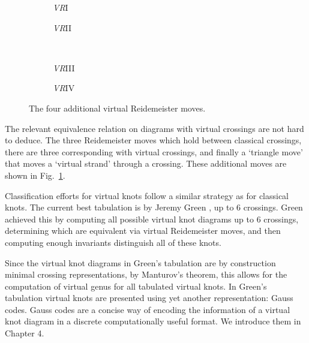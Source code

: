 \documentclass[12pt]{report}
\theoremstyle{upright}
\begin{document}
\begin{figure}[h!]
	\centering
	\hspace*{\fill}
	\begin{subfigure}[b]{0.35 \textwidth}
		\centering
		\def\svgscale{0.22}
		
		\caption{\textit{VR}I}
	\end{subfigure}
	\hspace*{\fill}
	\begin{subfigure}[b]{0.35 \textwidth}
		\centering
		\def\svgscale{0.22}
		
		\caption{\textit{VR}II}
	\end{subfigure}
	\hspace*{\fill}
	\\
	\hspace*{\fill}
	\begin{subfigure}[b]{0.35 \textwidth}
		\centering
		\def\svgscale{0.22}
		
		\caption{\textit{VR}III}
	\end{subfigure}
	\hspace*{\fill}
	\begin{subfigure}[b]{0.35 \textwidth}
		\centering
		\def\svgscale{0.22}
		
		\caption{\textit{VR}IV}
	\end{subfigure}
	\hspace*{\fill}
	\caption{The four additional virtual Reidemeister moves.}
	\label{fig:virtual-reidemeister-moves}
\end{figure}

The relevant equivalence relation on diagrams with virtual crossings are not hard to deduce. The three Reidemeister moves which hold between classical crossings, there are three corresponding with virtual crossings, and finally a `triangle move' that moves a `virtual strand' through a crossing. These additional moves are shown in Fig.~\ref{fig:virtual-reidemeister-moves}.

Classification efforts for virtual knots follow a similar strategy as for classical knots. The current best tabulation is by Jeremy Green \cite{virtual-knot-table}, up to 6 crossings. Green achieved this by computing all possible virtual knot diagrams up to $6$ crossings, determining which are equivalent via virtual Reidemeister moves, and then computing enough invariants distinguish all of these knots.

Since the virtual knot diagrams in Green's tabulation are by construction minimal crossing representations, by Manturov's theorem, this allows for the computation of virtual genus for all tabulated virtual knots. In Green's tabulation virtual knots are presented using yet another representation: Gauss codes. Gauss codes are a concise way of encoding the information of a virtual knot diagram in a discrete computationally useful format. We introduce them in Chapter 4.
\end{document}
